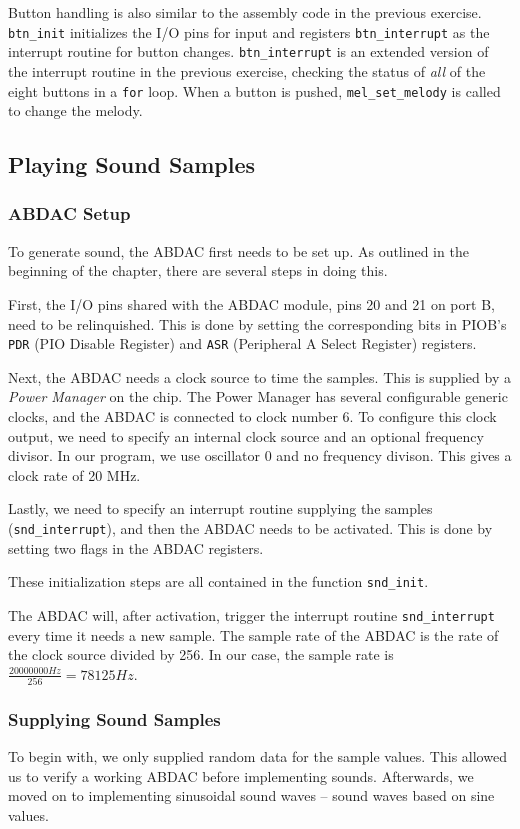 Button handling is also similar to the assembly code in the previous
exercise. \texttt{btn\_init} initializes the I/O pins for input and
registers \texttt{btn\_interrupt} as the interrupt routine for button
changes. \texttt{btn\_interrupt} is an extended version of the interrupt
routine in the previous exercise, checking the status of \emph{all} of
the eight buttons in a \texttt{for} loop. When a button is pushed,
\texttt{mel\_set\_melody} is called to change the melody.

\subsection{Playing Sound Samples}

\subsubsection{ABDAC Setup}
To generate sound, the ABDAC first needs to be set up. As outlined in
the beginning of the chapter, there are several steps in doing this.

First, the I/O pins shared with the ABDAC module, pins 20 and 21 on port
B, need to be relinquished. This is done by setting the corresponding
bits in PIOB's \texttt{PDR} (PIO Disable Register) and \texttt{ASR}
(Peripheral A Select Register) registers.

Next, the ABDAC needs a clock source to time the samples. This is
supplied by a \emph{Power Manager} on the chip. The Power Manager has
several configurable generic clocks, and the ABDAC is connected to clock
number 6. To configure this clock output, we need to specify an internal
clock source and an optional frequency divisor. In our program, we use
oscillator 0 and no frequency divison. This gives a clock rate of 20
MHz. \cite{ap7000}

Lastly, we need to specify an interrupt routine supplying the samples
(\texttt{snd\_interrupt}), and then the ABDAC needs to be activated.
This is done by setting two flags in the ABDAC registers.

These initialization steps are all contained in the function
\texttt{snd\_init}.

The ABDAC will, after activation, trigger the interrupt routine
\texttt{snd\_interrupt} every time it needs a new sample. The sample
rate of the ABDAC is the rate of the clock source divided by 256.
\cite{ap7000} In our case, the sample rate is $\frac{20000000
Hz}{256}=78125 Hz$.

\subsubsection{Supplying Sound Samples}
To begin with, we only supplied random data for the sample values. This
allowed us to verify a working ABDAC before implementing sounds.
Afterwards, we moved on to implementing sinusoidal sound waves -- sound
waves based on sine values.

